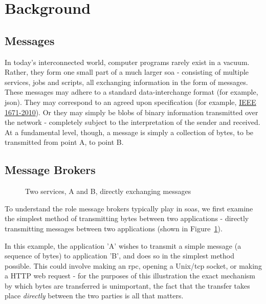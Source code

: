 \section{Background}
\label{sec:Background}

\subsection{Messages}
\label{sub:Messages}

In today's interconnected world, computer programs rarely exist in a vacuum.
Rather, they form one small part of a much larger \gls{soa} -
consisting of multiple services, jobs and scripts, all exchanging information in
the form of messages. These messages may adhere to a standard data-interchange
format (for example, \gls{json}). They may correspond to an agreed upon
specification (for example, \href{https://goo.gl/rjuP4C}{IEEE 1671-2010}).
Or they may simply be blobs of binary information transmitted over the network -
completely subject to the interpretation of the sender and received.
At a fundamental level, though, a message is simply a collection of bytes, to be
transmitted from point A, to point B.

\subsection{Message Brokers}
\label{sub:brokers}

\begin{figure}[ht]
  \centering
  
  \caption{Two services, A and B, directly exchanging messages}
  \label{fig:tikz:directMessaging}
\end{figure}

To understand the role message brokers typically play in \glspl{soa}, we first
examine the simplest method of transmitting bytes between two applications -
directly transmitting messages between two applications (shown in
Figure~\ref{fig:tikz:directMessaging}).

In this example, the application 'A' wishes to transmit a simple message (a
sequence of bytes) to application 'B', and does so in the simplest method
possible. This could involve making an \gls{rpc}, opening a Unix/\gls{tcp}
socket, or making a HTTP web request - for the purposes of this illustration the
exact mechanism by which bytes are transferred is unimportant, the fact that the
transfer takes place \emph{directly} between the two parties is all that
matters.

